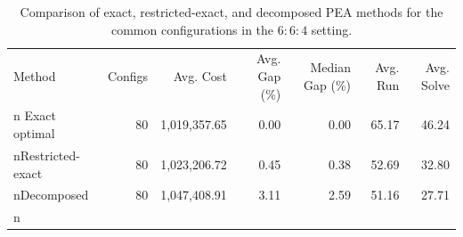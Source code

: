 \begin{table}[t]
\centering
\caption{Comparison of exact, restricted-exact, and decomposed PEA methods for the common configurations in the $6{:}6{:}4$ setting.}\n\label{tab:pea_s664_threeway}\n\begin{tabular}{lrrrrrr}\n\hline
Method & Configs & Avg. Cost & Avg. Gap (\%) & Median Gap (\%) & Avg. Run & Avg. Solve \\n\hline
Exact optimal & 80 & 1,019,357.65 & 0.00 & 0.00 & 65.17 & 46.24 \\nRestricted-exact & 80 & 1,023,206.72 & 0.45 & 0.38 & 52.69 & 32.80 \\nDecomposed & 80 & 1,047,408.91 & 3.11 & 2.59 & 51.16 & 27.71 \\n\hline
\end{tabular}\n\end{table}\n
